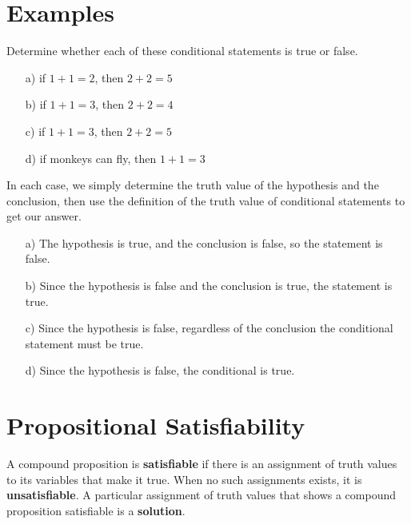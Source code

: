 \section{Examples}

\begin{ex}\cite[p.~14]{rosen}
  Determine whether each of these conditional statements is true or false.
  \begin{itemize}
    \item[a) ] if \(1+1=2\), then \(2+2=5\)
    \item[b) ] if \(1+1=3\), then \(2+2=4\)
    \item[c) ] if \(1+1=3\), then \(2+2=5\)
    \item[d) ] if monkeys can fly, then \(1+1=3\)
  \end{itemize}
  \begin{sol}
    In each case, we simply determine the truth value of the hypothesis and the conclusion, then use the definition of the truth value of conditional statements to get our answer.
    \begin{itemize}
      \item[a) ] The hypothesis is true, and the conclusion is false, so the statement is false.
      \item[b) ] Since the hypothesis is false and the conclusion is true, the statement is true.
      \item[c) ] Since the hypothesis is false, regardless of the conclusion the conditional statement must be true.
      \item[d) ] Since the hypothesis is false, the conditional is true.
    \end{itemize}
  \end{sol}
\end{ex}

\section{Propositional Satisfiability}

A compound proposition is \textbf{satisfiable} if there is an assignment of truth values to its variables that make it true.
When no such assignments exists, it is \textbf{unsatisfiable}.
A particular assignment of truth values that shows a compound proposition satisfiable is a \textbf{solution}.

